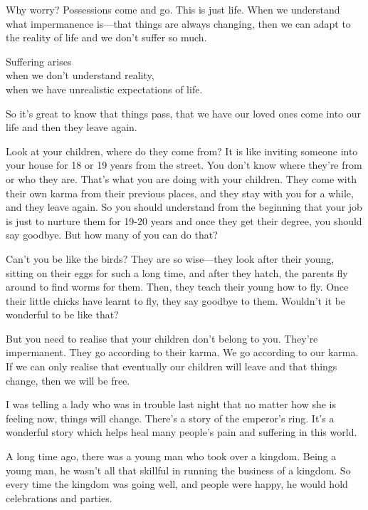 \documentclass[12pt, openany]{book}
\newenvironment{aphorism}%
{%
\begin{center}\begin{itshape}
}%
{\end{itshape}\end{center}
}%
\begin{document}
Why worry? Possessions come and go. This is just life. When we understand what impermanence is—that things are always changing, then we can adapt to the reality of life and we don’t suffer so much. 

\newpage

\begin{aphorism}
Suffering arises\\  
when we don’t understand reality,\\ 
when we have unrealistic expectations of life.
\end{aphorism}

So it’s great to know that things pass, that we have our loved ones come into our life and then they leave again. 

Look at your children, where do they come from? It is like inviting someone into your house for 18 or 19 years from the street. You don’t know where they’re from or who they are. That’s what you are doing with your children. They come with their own karma from their previous places, and they stay with you for a while, and they leave again. So you should understand from the beginning that your job is just to nurture them for 19-20 years and once they get their degree, you should say goodbye. But how many of you can do that? 

Can’t you be like the birds? They are so wise—they look after their young, sitting on their eggs for such a long time, and after they hatch, the parents fly around to find worms for them. Then, they teach their young how to fly. Once their little chicks have learnt to fly, they say goodbye to them. Wouldn’t it be wonderful to be like that? 

But you need to realise that your children don’t belong to you. They’re impermanent. They go according to their karma. We go according to our karma. If we can only realise that eventually our children will leave and that things change, then we will be free. 

I was telling a lady who was in trouble last night that no matter how she is feeling now, things will change. There’s a story of the emperor’s ring. It’s a wonderful story which helps heal many people’s pain and suffering in this world. 

A long time ago, there was a young man who took over a kingdom. Being a young man, he wasn’t all that skillful in running the business of a kingdom. So every time the kingdom was going well, and people were happy, he would hold celebrations and parties. 
\end{document}
